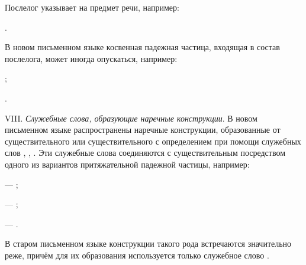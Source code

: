 Послелог  указывает на предмет речи, например:
\begin{prfsample}
	\item {}.
\end{prfsample}

В новом письменном языке косвенная падежная частица, входящая в состав послелога, может иногда опускаться, например:
\begin{prfsample}
	\item {};
	\item {}.
\end{prfsample}

VIII. \emph{Служебные слова, образующие наречные конструкции}. В новом письменном языке распространены наречные конструкции, образованные от существительного или существительного с определением при помощи служебных слов , , .
Эти служебные слова соединяются с существительным посредством одного из вариантов притяжательной падежной частицы, например:
\begin{prfsample}
	\item {} --- ;
	\item {} --- ;
	\item {} --- .
\end{prfsample}
В старом письменном языке конструкции такого рода встречаются значительно реже, причём для их образования используется только служебное слово .

